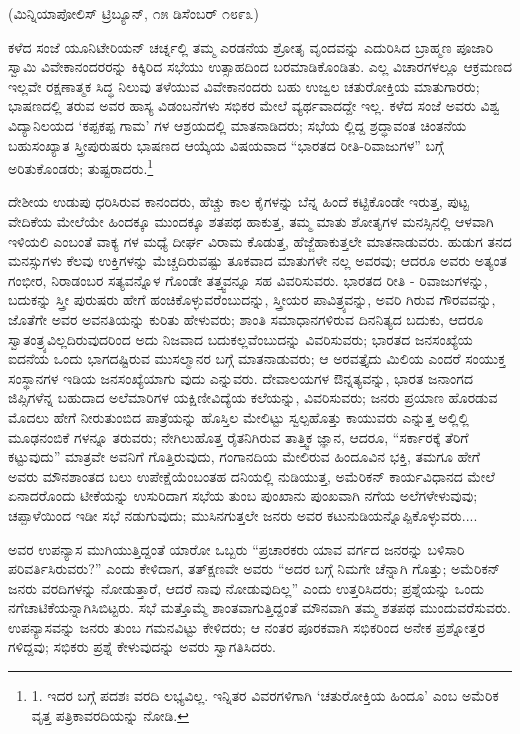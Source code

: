 \begin{center}
(ಮಿನ್ನಿಯಾಪೋಲಿಸ್ ಟ್ರಿಬ್ಯೂನ್, ೧೫ ಡಿಸೆಂಬರ್ ೧೮೯೩)
\end{center}

ಕಳೆದ ಸಂಜೆ ಯೂನಿಟೇರಿಯನ್ ಚರ್ಚ್ನಲ್ಲಿ ತಮ್ಮ ಎರಡನೆಯ ಶ್ರೋತೃ ವೃಂದವನ್ನು ಎದುರಿಸಿದ ಬ್ರಾಹ್ಮಣ ಪೂಜಾರಿ ಸ್ವಾಮಿ ವಿವೇಕಾನಂದರರನ್ನು ಕಿಕ್ಕಿರಿದ ಸಭೆಯು ಉತ್ಸಾಹದಿಂದ ಬರಮಾಡಿಕೊಂಡಿತು. ಎಲ್ಲ ವಿಚಾರಗಳಲ್ಲೂ ಆಕ್ರಮಣದ ಇಲ್ಲವೇ ರಕ್ಷಣಾತ್ಮಕ ಸಿದ್ಧ ನಿಲುವು ತಳೆಯುವ ವಿವೇಕಾನಂದರು ಬಹು ಉಜ್ವಲ ಚತುರೋಕ್ತಿಯ ಮಾತುಗಾರರು; ಭಾಷಣದಲ್ಲಿ ತರುವ ಅವರ ಹಾಸ್ಯ ವಿಡಂಬನೆಗಳು ಸಭಿಕರ ಮೇಲೆ ವ್ಯರ್ಥವಾದದ್ದೇ ಇಲ್ಲ. ಕಳೆದ ಸಂಜೆ ಅವರು ವಿಶ್ವ ವಿದ್ಯಾನಿಲಯದ ‘ಕಪ್ಪಕಪ್ಪ ಗಾಮ’ ಗಳ ಆಶ್ರಯದಲ್ಲಿ ಮಾತನಾಡಿದರು; ಸಭೆಯ ಲ್ಲಿದ್ದ ಶ್ರದ್ಧಾವಂತ ಚಿಂತನೆಯ ಬಹುಸಂಖ್ಯಾತ ಸ್ತ್ರೀಪುರುಷರು ಭಾಷಣದ ಆಯ್ಕೆಯ ವಿಷಯವಾದ “ಭಾರತದ ರೀತಿ-ರಿವಾಜುಗಳ” ಬಗ್ಗೆ ಅರಿತುಕೊಂಡರು; ತುಷ್ಟರಾದರು.\footnote{1. ಇದರ ಬಗ್ಗೆ ಪದಶಃ ವರದಿ ಲಭ್ಯವಿಲ್ಲ. ಇನ್ನಿತರ ವಿವರಗಳಿಗಾಗಿ ‘ಚತುರೋಕ್ತಿಯ ಹಿಂದೂ’ ಎಂಬ ಅಮೆರಿಕ ವೃತ್ತ ಪತ್ರಿಕಾವರದಿಯನ್ನು ನೋಡಿ.}

ದೇಶೀಯ ಉಡುಪು ಧರಿಸಿರುವ ಕಾನಂದರು, ಹೆಚ್ಚು ಕಾಲ ಕೈಗಳನ್ನು ಬೆನ್ನ ಹಿಂದೆ ಕಟ್ಟಿಕೊಂಡೇ ಇರುತ್ತ, ಪುಟ್ಟ ವೇದಿಕೆಯ ಮೇಲೆಯೇ ಹಿಂದಕ್ಕೂ ಮುಂದಕ್ಕೂ ಶತಪಥ ಹಾಕುತ್ತ, ತಮ್ಮ ಮಾತು ಶೋತೃಗಳ ಮನಸ್ಸಿನಲ್ಲಿ ಆಳವಾಗಿ ಇಳಿಯಲಿ ಎಂಬಂತೆ ವಾಕ್ಯ ಗಳ ಮಧ್ಯೆ ದೀರ್ಘ ವಿರಾಮ ಕೊಡುತ್ತ, ಹೆಜ್ಜೆಹಾಕುತ್ತಲೇ ಮಾತನಾಡುವರು. ಹುಡುಗ ತನದ ಮನಸ್ಸುಗಳು ಕೆಲವು ಉಕ್ತಿಗಳನ್ನು ಮೆಚ್ಚದಿರುವಷ್ಟು ತೂಕವಾದ ಮಾತುಗಳೇ ನಲ್ಲ ಅವರವು; ಆದರೂ ಅವರು ಅತ್ಯಂತ ಗಂಭೀರ, ನಿರಾಡಂಬರ ಸತ್ಯವನ್ನೊಳ ಗೊಂಡೇ ತತ್ತ್ವವನ್ನೂ ಸಹ ವಿವರಿಸುವರು. ಭಾರತದ ರೀತಿ - ರಿವಾಜುಗಳನ್ನು, ಬದುಕನ್ನು ಸ್ತ್ರೀ ಪುರುಷರು ಹೇಗೆ ಹಂಚಿಕೊಳ್ಳುವರೆಂಬುದನ್ನು, ಸ್ತ್ರೀಯರ ಪಾವಿತ್ರ್ಯವನ್ನು, ಅವರಿ ಗಿರುವ ಗೌರವವನ್ನು, ಜೊತೆಗೇ ಅವರ ಅವನತಿಯನ್ನು ಕುರಿತು ಹೇಳುವರು; ಶಾಂತಿ ಸಮಾಧಾನಗಳಿರುವ ದಿನನಿತ್ಯದ ಬದುಕು, ಆದರೂ ಸ್ವಾತಂತ್ರ್ಯವಿಲ್ಲದಿರುವುದರಿಂದ ಅದು ನಿಜವಾದ ಬದುಕಲ್ಲವೆಂಬುದನ್ನು ವಿವರಿಸುವರು; ಭಾರತದ ಜನಸಂಖ್ಯೆಯ ಐದನೆಯ ಒಂದು ಭಾಗದಷ್ಟಿರುವ ಮುಸಲ್ಮಾನರ ಬಗ್ಗೆ ಮಾತನಾಡುವರು; ಆ ಅರವತ್ತೈದು ಮಿಲಿಯ ಎಂದರೆ ಸಂಯುಕ್ತ ಸಂಸ್ಥಾನಗಳ ಇಡಿಯ ಜನಸಂಖ್ಯೆಯಾಗು ವುದು ಎನ್ನುವರು. ದೇವಾಲಯಗಳ ಔನ್ನತ್ಯವನ್ನು, ಭಾರತ ಜನಾಂಗದ ಜಿಪ್ಸಿಗಳೆನ್ನ ಬಹುದಾದ ಅಲೆಮಾರಿಗಳ ಯಕ್ಷಿಣೀವಿದ್ಯೆಯ ಕಲೆಯನ್ನು, ವಿವರಿಸುವರು; ಜನರು ಪ್ರಯಾಣ ಹೊರಡುವ ಮೊದಲು ಹೇಗೆ ನೀರುತುಂಬಿದ ಪಾತ್ರೆಯನ್ನು ಹೊಸ್ತಿಲ ಮೇಲಿಟ್ಟು ಸ್ವಲ್ಪಹೊತ್ತು ಕಾಯುವರು ಎನ್ನುತ್ತ ಅಲ್ಲಿಲ್ಲಿ ಮೂಢನಂಬಿಕೆ ಗಳನ್ನೂ ತರುವರು; ನೇಗಿಲುಹೊತ್ತ ರೈತನಿಗಿರುವ ತಾತ್ತ್ವಿಕ ಜ್ಞಾನ, ಆದರೂ, “ಸರ್ಕಾರಕ್ಕೆ ತೆರಿಗೆ ಕಟ್ಟುವುದು” ಮಾತ್ರವೇ ಅವನಿಗೆ ಗೊತ್ತಿರುವುದು, ಗಂಗಾನದಿಯ ಮೇಲಿರುವ ಹಿಂದೂವಿನ ಭಕ್ತಿ, ತಮಗೂ ಹೇಗೆ ಅವರು ಮೌನಶಾಂತದ ಬಲು ಉಪೇಕ್ಷೆಯೆಂಬಂತಹ ದನಿಯಲ್ಲಿ ನುಡಿಯುತ್ತ, ಅಮೆರಿಕನ್ ಕಾರ್ಯವಿಧಾನದ ಮೇಲೆ ಏನಾದರೊಂದು ಟೀಕೆಯನ್ನು ಉಸುರಿದಾಗ ಸಭೆಯ ತುಂಬ ಪುಂಖಾನು ಪುಂಖವಾಗಿ ನಗೆಯ ಅಲೆಗಳೇಳುವುವು; ಚಪ್ಪಾಳೆಯಿಂದ ಇಡೀ ಸಭೆ ನಡುಗುವುದು; ಮುಸಿನಗುತ್ತಲೇ ಜನರು ಅವರ ಕಟುನುಡಿಯನ್ನೊಪ್ಪಿಕೊಳ್ಳುವರು....

ಅವರ ಉಪನ್ಯಾಸ ಮುಗಿಯುತ್ತಿದ್ದಂತೆ ಯಾರೋ ಒಬ್ಬರು “ಪ್ರಚಾರಕರು ಯಾವ ವರ್ಗದ ಜನರನ್ನು ಬಳಿಸಾರಿ ಪರಿವರ್ತಿಸಿರುವರು?” ಎಂದು ಕೇಳಿದಾಗ, ತತ್ಕ್ಷಣವೇ ಅವರು “ಅದರ ಬಗ್ಗೆ ನಿಮಗೇ ಚೆನ್ನಾಗಿ ಗೊತ್ತು; ಅಮೆರಿಕನ್ ಜನರು ವರದಿಗಳನ್ನು ನೋಡುತ್ತಾರೆ, ಆದರೆ ನಾವು ನೋಡುವುದಿಲ್ಲ” ಎಂದು ಉತ್ತರಿಸಿದರು; ಪ್ರಶ್ನೆಯನ್ನು ಒಂದು ನಗೆಚಾಟಿಕೆಯನ್ನಾಗಿಸಿಬಿಟ್ಟರು. ಸಭೆ ಮತ್ತೊಮ್ಮೆ ಶಾಂತವಾಗುತ್ತಿದ್ದಂತೆ ಮೌನವಾಗಿ ತಮ್ಮ ಶತಪಥ ಮುಂದುವರೆಸುವರು. ಉಪನ್ಯಾಸವನ್ನು ಜನರು ತುಂಬ ಗಮನವಿಟ್ಟು ಕೇಳಿದರು; ಆ ನಂತರ ಪೂರಕವಾಗಿ ಸಭಿಕರಿಂದ ಅನೇಕ ಪ್ರಶ್ನೋತ್ತರ ಗಳಿದ್ದವು; ಸಭಿಕರು ಪ್ರಶ್ನೆ ಕೇಳುವುದನ್ನು ಅವರು ಸ್ವಾಗತಿಸಿದರು.

